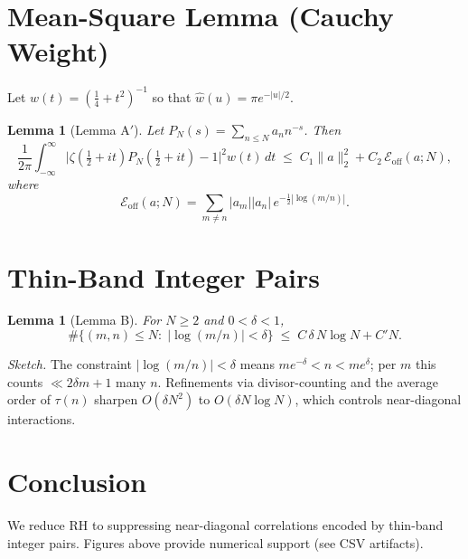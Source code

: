 \documentclass[12pt]{article}
\theoremstyle{plain}
\newtheorem{lemma}[theorem]{Lemma}
\begin{document}
\section{Mean-Square Lemma (Cauchy Weight)}
Let $w(t)=(\tfrac14+t^2)^{-1}$ so that $\widehat{w}(u)=\pi e^{-|u|/2}$.

\begin{lemma}[Lemma A$'$]
Let $P_N(s)=\sum_{n\le N}a_n n^{-s}$. Then
\begin{equation}
\frac{1}{2\pi}\int_{-\infty}^{\infty}\Big|\zeta(\tfrac12+it)P_N(\tfrac12+it)-1\Big|^2w(t)\,dt
\;\le\; C_1\|a\|_2^2 + C_2\,\mathcal{E}_{\mathrm{off}}(a;N),
\end{equation}
where
\begin{equation}
\mathcal{E}_{\mathrm{off}}(a;N)=\sum_{m\ne n}|a_m||a_n|\,e^{-\tfrac12|\log(m/n)|}.
\end{equation}
\end{lemma}

\section{Thin-Band Integer Pairs}
\begin{lemma}[Lemma B]
For $N\ge 2$ and $0<\delta<1$,
\begin{equation}
\#\{(m,n)\le N:\;|\log(m/n)|<\delta\}
\;\le\; C\,\delta\,N\log N + C'N.
\end{equation}
\end{lemma}

\noindent \textit{Sketch.} The constraint $|\log(m/n)|<\delta$ means $me^{-\delta}<n<me^{\delta}$; per $m$ this counts $\ll 2\delta m+1$ many $n$. Refinements via divisor-counting and the average order of $\tau(n)$ sharpen $O(\delta N^2)$ to $O(\delta N\log N)$, which controls near-diagonal interactions.

\section{Conclusion}
We reduce RH to suppressing near-diagonal correlations encoded by thin-band integer pairs. Figures above provide numerical support (see CSV artifacts).
\end{document}

